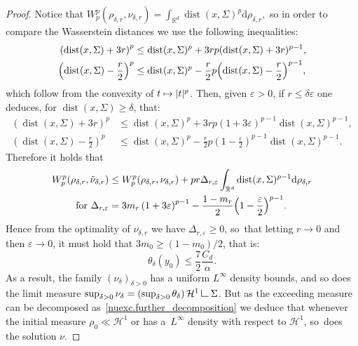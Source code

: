 \documentclass[JEP,XML,SOM,Unicode,NoFloatCountersInSection,published]{cedram}
\newcommand\mto{\mathchoice{\longmapsto}{\mapsto}{\mapsto}{\mapsto}}
\theoremstyle{definition}
\newcommand\LM[1]{\hbox{\vrule width.5pt \vbox to#1pt{\vfill \hrule width#1pt height.5pt}}}
\newcommand\LL{{\mathchoice {\>\LM7\>}{\>\LM7\>}{\,\LM5\,}{\,\LM{3.35}\,}}}
\newcommand{\mres}{\LL}
\newcommand\cH{\mathcal{H}}
\newcommand{\RR}{\mathbb{R}}
\DeclareMathOperator{\dist}{dist}
\newcommand\dd{\mathrm{d}}
\begin{document}
\begin{proof}
Notice that
$
W_p^p(\rho_{\delta, r},\nu_{\delta, r})
=
\int_{\RR^d} \dist(x,\Sigma)^p\dd \rho_{\delta,r},
$
so in order to compare the Wasserstein distances we use the following inequalities:
\begin{align*}
\left(\dist(x,\Sigma) + 3r\right)^p
&\le
\dist(x,\Sigma)^p
+
3rp
(\dist(x,\Sigma)+3r)^{p-1}, \\
\left(\dist(x,\Sigma) -\frac{r}{2}\right)^p
&\le
\dist(x,\Sigma)^p
-
\frac{r}{2}p
\Bigl(\dist(x,\Sigma)-\frac{r}{2}\Bigr)^{p-1},
\end{align*}
which follow from the convexity of $t\mto |t|^p$.
Then, given $\varepsilon>0$, if $r\le \delta\varepsilon$ one deduces,
for $\dist(x,\Sigma)\ge \delta$, that:
\begin{align*}
\left(\dist(x,\Sigma) + 3r\right)^p
&\le
\dist(x,\Sigma)^p
+
3 r p(1+3\varepsilon)^{p-1}
\dist(x,\Sigma)^{p-1}, \\
\left(\dist(x,\Sigma) -\frac{r}{2}\right)^p
&\le
\dist(x,\Sigma)^p
-
\frac{r}{2}p \left(1-\frac{\varepsilon}{2}\right)^{p-1}
\dist(x,\Sigma)^{p-1}.
\end{align*}
Therefore it holds that
\begin{align*}
W_p^p(\rho_{\delta, r}, \tilde\nu_{\delta, r})
&\le
W_p^p(\rho_{\delta, r}, \nu_{\delta, r})
+
pr\Delta_{r,\varepsilon}
\int_{\RR^d}
\dist(x,\Sigma)^{p-1}\dd \rho_{\delta,r}\\
\text{ for }
\Delta_{r,\varepsilon}
&=
3m_{r}
\left(
1 + 3\varepsilon
\right)^{p-1}
-
\frac{1 - m_r}{2}
\Bigl(
1 - \frac{\varepsilon}{2}
\Bigr)^{p-1}.
\end{align*}
Hence from the optimality of $\nu_{\delta,r}$ we have $\Delta_{r,\varepsilon} \ge 0$, so~that letting $r \to 0$ and then $\varepsilon\to 0$, it must hold that
$3 m_0\ge (1-m_0)/2$, that is:
\[
\theta_\delta(y_0)
\le
\frac{7}{2}\frac{C_d}{\alpha}.
\]
As a result, the family $\left(\nu_\delta\right)_{\delta > 0}$ has a uniform $L^\infty$ density bounds, and so does the limit measure $\sup_{\delta > 0} \nu_\delta = \left(\sup_{\delta > 0}\theta_\delta\right)\cH^1\mres \Sigma$. But as the exceeding measure can be decomposed as~\eqref{nuexc.further_decomposition} we deduce that
whenever the initial measure $\rho_0 \ll \cH^1$ or has a~$L^{\infty}$ density with respect to $\cH^1$, so~does the solution $\nu$.
\end{proof}
\end{document}
